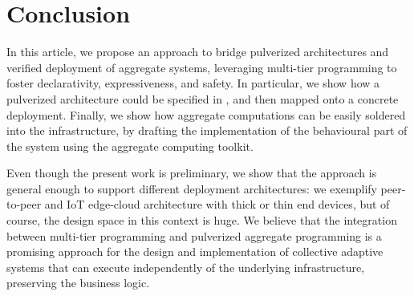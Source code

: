 \section{Conclusion}
\label{conclusion}
In this article, we propose an approach 
 to bridge pulverized architectures 
 and verified deployment of aggregate systems,
leveraging multi-tier programming to foster 
 declarativity, expressiveness, and safety. 
%
In particular, we show how a pulverized architecture could be specified in \scalaloci{},
and then mapped onto a concrete deployment.
%
Finally, we show how aggregate computations can be easily soldered into the infrastructure,
by drafting the implementation of the behavioural part of the system using the \scafi{} aggregate computing toolkit.

Even though the present work is preliminary,
we show that the approach is general enough to support different deployment architectures:
we exemplify peer-to-peer and IoT edge-cloud architecture with thick or thin end devices,
but of course, the design space in this context is huge.
%
We believe that the integration between multi-tier programming and pulverized aggregate programming is a promising approach for the design and implementation of collective adaptive systems that can execute independently of the underlying infrastructure,
preserving the business logic.
